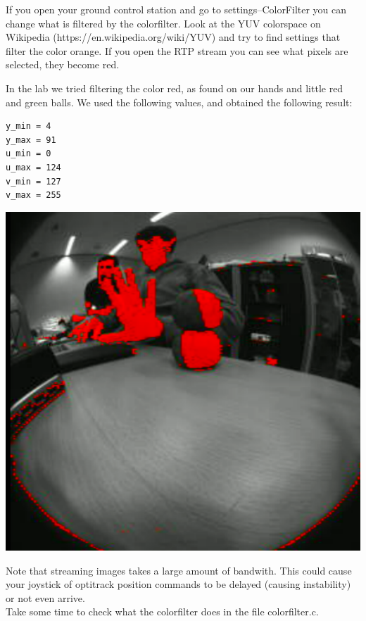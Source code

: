 \documentclass{article}
\begin{document}
If you open your ground control station and go to settings--ColorFilter you can change what is filtered by the colorfilter. Look at the YUV colorspace on Wikipedia (https://en.wikipedia.org/wiki/YUV) and try to find settings that filter the color orange. If you open the RTP stream you can see what pixels are selected, they become red. 

In the lab we tried filtering the color red, as found on our hands and little red and green balls. We used the following values, and obtained the following result:
\begin{verbatim}
y_min = 4
y_max = 91
u_min = 0
u_max = 124
v_min = 127
v_max = 255
\end{verbatim}
\includegraphics[width=0.8\linewidth]{filtered}

Note that streaming images takes a large amount of bandwith. This could cause your joystick of optitrack position commands to be delayed (causing instability) or not even arrive.\\

\noindent Take some time to check what the colorfilter does in the file colorfilter.c. 
\end{document}
